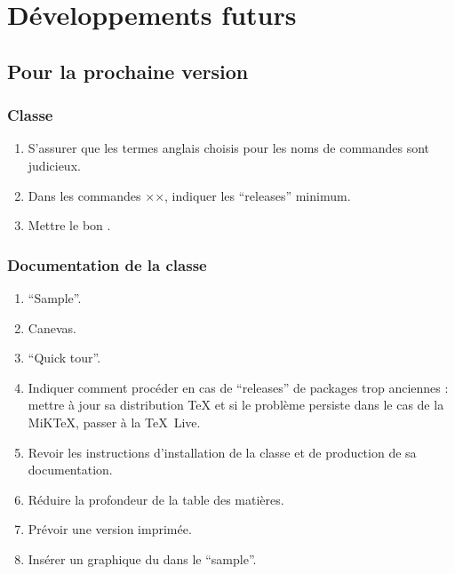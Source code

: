 \chapter{Développements futurs}\label{cha:devel-futurs}

\section{Pour la prochaine version}
\label{sec:pour-la-prochaine}

\subsection{Classe}
\label{sec:classe}

\begin{enumerate}
\item S'assurer que les termes anglais choisis pour les noms de commandes sont
  judicieux.
\item Dans les commandes ×\RequirePackage×, indiquer les \enquote{releases}
  minimum.
\item Mettre le bon .
\end{enumerate}

\subsection{Documentation de la classe}
\label{sec:documentation-de-la}

\begin{enumerate}
\item \foreignquote{english}{Sample}.
\item Canevas.
\item \foreignquote{english}{Quick tour}.
\item Indiquer comment procéder en cas de \enquote{releases} de packages trop
  anciennes : mettre à jour sa distribution \TeX{} et si le problème persiste
  dans le cas de la MiK\TeX{}, passer à la \TeX~Live.
\item Revoir les instructions d'installation de la classe et de production de
  sa documentation.
\item Réduire la profondeur de la table des matières.
\item Prévoir une version imprimée.
\item Insérer un graphique du  dans le \foreignquote{english}{sample}.
\end{enumerate}

